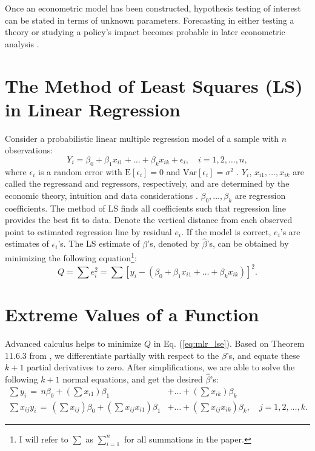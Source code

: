 \documentclass[final]{siamart1116}
\begin{document}
Once an econometric model has been constructed, hypothesis testing of interest can be stated in terms of unknown parameters. Forecasting in either testing a theory or studying a policy’s impact becomes probable in later econometric analysis \cite{bk:wooldridge}.


\section{The Method of Least Squares (LS) in Linear Regression}
\label{sec:misc}
Consider a probabilistic linear multiple regression model of a sample with $n$ observations:
\begin{equation}\label{eq:mlr}
{Y_{i}}=\beta_{0}+\beta_{1}{x_{i1}}+\dots+\beta_{k}x_{ik}+\epsilon_{i},\quad i=1,2,\dots,n,
\end{equation}
where $\epsilon_{i}$ is a random error with $\mathrm{E}[\epsilon_{i}]=0$ and $\mathrm{Var}[\epsilon_{i}]=\sigma^{2}$ \cite{bk:tamhane_dunlop}. $Y_{i}$, $x_{i1},\dots, x_{ik}$ are called the regressand and regressors, respectively, and are determined by the economic theory, intuition and data considerations \cite{bk:stock_watson, bk:wooldridge}. $\beta_{0},\dots, \beta_{k}$ are regression coefficients. The method of LS finds all coefficients such that regression line provides the best fit to data. Denote the vertical distance from each observed point to estimated regression line by residual $e_{i}$. If the model is correct, $e_{i}$'s are estimates of $\epsilon_{i}$'s. The LS estimate of $\beta$'s, denoted by $ \widehat{\beta}$'s, can be obtained by minimizing the following equation\footnote{I will refer to $\sum$ as $\sum_{i=1}^{n}$ for all summations in the paper.}: 
\begin{equation}\label{eq:mlr_lse}
Q=\sum e_{i}^{2}=\sum\left[y_{i}-(\beta_{0}+\beta_{1}{x_{i1}}+\dots+\beta_{k}x_{ik})\right]^2.
\end{equation}


\section{Extreme Values of a Function}
\label{sec:ac}
Advanced calculus helps to minimize $Q$ in Eq. (\ref{eq:mlr_lse}). Based on Theorem 11.6.3 from \cite{bk:petrovic}, we differentiate partially with respect to the $\beta$'s, and equate these $k+1$ partial derivatives to zero. After simplifications, we are able to solve the following $k+1$ normal equations, and get the desired $\widehat{\beta}$'s:
\begin{equation}\label{eq:mlr_normal}
\begin{aligned}
\sum y_{i}\,=\,n\beta_{0}+\left(\sum x_{i1}\right)\beta_{1}&+\dots+\left(\sum x_{ik}\right)\beta_{k}\\
\sum x_{ij}y_{i}\,=\,\left(\sum x_{ij}\right)\beta_{0}+\left(\sum x_{ij}x_{i1}\right)\beta_{1}&+\dots+\left(\sum x_{ij}x_{ik}\right)\beta_{k},\quad j=1,2,\dots,k.
\end{aligned}
\end{equation}
\end{document}
